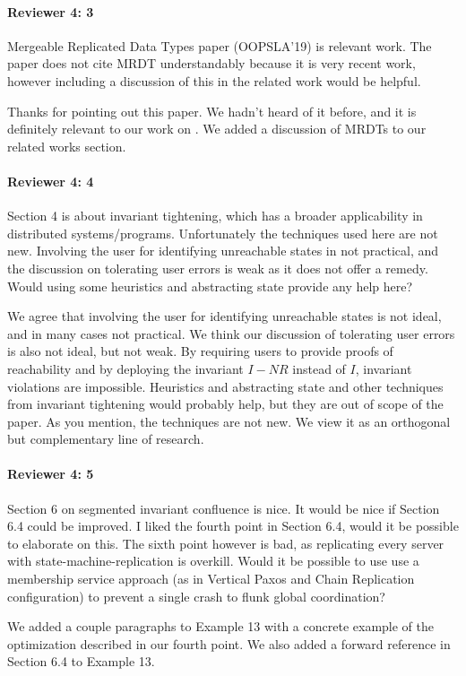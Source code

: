 \documentclass[9pt]{article}
\begin{document}
\begin{multicols*}{2}
\paragraph{Reviewer 4: 3}
\begin{feedback}
  Mergeable Replicated Data Types paper (OOPSLA'19) is relevant work. The paper
  does not cite MRDT understandably because it is very recent work, however
  including a discussion of this in the related work would be helpful.
\end{feedback}
Thanks for pointing out this paper. We hadn't heard of it before, and it is
definitely relevant to our work on \invariantconfluence{}. We added a
discussion of MRDTs to our related works section.

\paragraph{Reviewer 4: 4}
\begin{feedback}
  Section 4 is about invariant tightening, which has a broader applicability in
  distributed systems/programs. Unfortunately the techniques used here are not
  new. Involving the user for identifying unreachable states in not practical,
  and the discussion on tolerating user errors is weak as it does not offer a
  remedy. Would using some heuristics and abstracting state provide any help
  here?
\end{feedback}
We agree that involving the user for identifying unreachable states is not
ideal, and in many cases not practical. We think our discussion of tolerating
user errors is also not ideal, but not weak. By requiring users to provide
proofs of reachability and by deploying the invariant $I - NR$ instead of $I$,
invariant violations are impossible.
%
Heuristics and abstracting state and other techniques from invariant tightening
would probably help, but they are out of scope of the paper. As you mention,
the techniques are not new. We view it as an orthogonal but complementary line
of research.

\paragraph{Reviewer 4: 5}
\begin{feedback}
  Section 6 on segmented invariant confluence is nice. It would be nice if
  Section 6.4 could be improved. I liked the fourth point in Section 6.4, would
  it be possible to elaborate on this. The sixth point however is bad, as
  replicating every server with state-machine-replication is overkill. Would it
  be possible to use use a membership service approach (as in Vertical Paxos
  and Chain Replication configuration) to prevent a single crash to flunk
  global coordination?
\end{feedback}
We added a couple paragraphs to Example 13 with a concrete example of the
optimization described in our fourth point. We also added a forward reference
in Section 6.4 to Example 13.


\end{multicols*}
\end{document}
